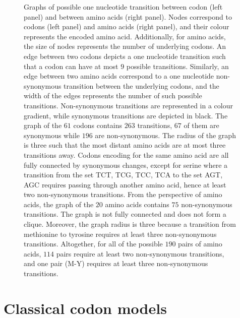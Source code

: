 \begin{figure}[htbp!]
    \caption[Graphs of {codon} and amino-acid transitions]{
    \label{fig:graph-codons-aa}
    Graphs of possible one nucleotide {transition} between codon (left panel) and between amino acids (right panel).
    Nodes correspond to codons (left panel) and amino acids (right panel), and their colour represents the encoded amino acid.
    Additionally, for amino acids, the size of nodes represents the number of underlying codons.
    An edge between two codons depicts a one nucleotide {transition} such that a codon can have at most $9$ possible {transitions}.
    Similarly, an edge between two amino acids correspond to a one nucleotide non-synonymous {transition} between the underlying codons, and the width of the edges represents the number of such possible {transitions}.
    Non-synonymous {transitions} are represented in a colour gradient, while synonymous {transitions} are depicted in black.
    The graph of the $61$ codons contains $263$ {transitions}, $67$ of them are synonymous while $196$ are non-synonymous.
    The radius of the graph is three such that the most distant amino acids are at most three {transitions} away.
    Codons encoding for the same amino acid are all fully connected by synonymous changes, except for serine where a {transition} from the set {TCT, TCG, TCC, TCA} to the set {AGT, AGC} requires passing through another amino acid, hence at least two non-synonymous {transitions}.
    From the perspective of amino acids, the graph of the $20$ amino acids contains $75$ non-synonymous {transitions}.
    The graph is not fully connected and does not form a clique. Moreover, the graph radius is three because a {transition} from methionine to tyrosine requires at least three non-synonymous {transitions}.
    Altogether, for all of the possible $190$ pairs of amino acids, $114$ pairs require at least two non-synonymous {transitions}, and one pair (M-Y) requires at least three non-synonymous {transitions}.
    }
\end{figure}


\section{Classical codon models}
\label{sec:intro-classical-codon-models}

